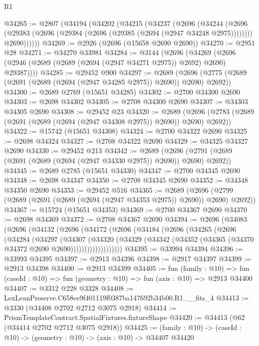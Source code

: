 \begin{lexlean}{R1}
\begin{coremodule}
@34265 := @2807
    (@34194
      (@34202
        (@34215
          (@34237
            (@2696
              (@34244
                (@2696 (@29383 (@2696 (@29384 (@2696 (@29385 (@2694 (@2947 @34248 @2975))))))))
                @2690))))))
@34269 := @2926 (@2696 (@15658 @2690 @2690))
@34270 := @2951 @28
@34271 := @34270 @33981
@34284 := @3144
    (@2696 (@34269 (@2696 (@2946 (@2689 (@2689 (@2694 (@2947 @34271 @2975)) @2692) @2690) @29387))))
@34285 := @29452 @900
@34297 := @2689
    (@2696 (@2775 (@2689 (@2691 (@2689 (@2694 (@2947 @34285 @2975)) @2690)) @2690) @2692))
@34300 := @2689 @2769 (@15651 @34285)
@34302 := @2700 @34300 @2690
@34303 := @2698 @34302
@34305 := @2708 @34300 @2690
@34307 := @34303 @34305 @2690
@34308 := @29452 @23
@34320 := @2689
    (@2696 (@2783 (@2689 (@2691 (@2689 (@2694 (@2947 @34308 @2975)) @2690)) @2690) @2692))
@34322 := @15742 (@15651 @34308)
@34324 := @2700 @34322 @2690
@34325 := @2698 @34324
@34327 := @2708 @34322 @2690
@34329 := @34325 @34327 @2690
@34330 := @29452 @213
@34342 := @2689
    (@2696 (@2791 (@2689 (@2691 (@2689 (@2694 (@2947 @34330 @2975)) @2690)) @2690) @2692))
@34345 := @2689 @2785 (@15651 @34330)
@34347 := @2700 @34345 @2690
@34348 := @2698 @34347
@34350 := @2708 @34345 @2690
@34352 := @34348 @34350 @2690
@34353 := @29452 @516
@34365 := @2689
    (@2696 (@2799 (@2689 (@2691 (@2689 (@2694 (@2947 @34353 @2975)) @2690)) @2690) @2692))
@34367 := @15724 (@15651 @34353)
@34369 := @2700 @34367 @2690
@34370 := @2698 @34369
@34372 := @2708 @34367 @2690
@34394 := @2696
    (@34083
      (@2696
        (@34132
          (@2696
            (@34172
              (@2696
                (@34184
                  (@2696
                    (@34265
                      (@2696
                        (@34284
                          (@34297
                            (@34307
                              (@34320
                                (@34329
                                  (@34342
                                    (@34352 (@34365 (@34370 @34372 @2690 @2690)))))))))))))))))))
@34395 := @33994 @34394
@34396 := @33993 @34395
@34397 := @2913 @34396
@34398 := @2917 @34397
@34399 := @2913 @34398
@34400 := @2913 @34399
@34405 := fun (family : @10) =>
  fun (caseId : @10) => fun (geometry : @10) => fun (axis : @10) => @2913 @34400
@34407 := @3312 @228 @3328
@34408 := LexLeanPreserve.C658ee9f401119f0387ba147692b34b00.R1.__fits_4
@34413 := @3330 (@34408 @2702 @2712 @3075 @2918)
@34414 := PrismTemplateContract.SpatialFixtures.fixtureShape
@34420 := @34413 (@62 (@34414 @2702 @2712 @3075 @2918))
@34425 := (family : @10) -> (caseId : @10) -> (geometry : @10) -> (axis : @10) -> @34407 @34420

\end{coremodule}
\end{lexlean}
